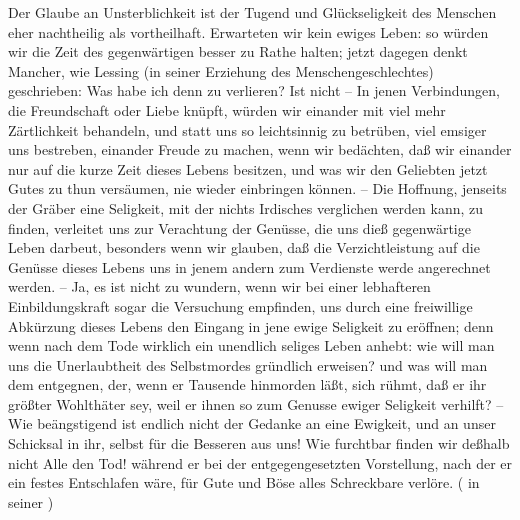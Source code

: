  Der Glaube an Unsterblichkeit ist der Tugend und Glückseligkeit des Menschen eher nachtheilig als vortheilhaft. Erwarteten wir kein ewiges Leben: so würden wir die Zeit des gegenwärtigen besser zu Rathe halten; jetzt dagegen denkt Mancher, wie Lessing (in seiner Erziehung des Menschengeschlechtes) geschrieben: Was habe ich denn zu verlieren? Ist nicht  -- In jenen Verbindungen, die Freundschaft oder Liebe knüpft, würden wir einander mit viel mehr Zärtlichkeit behandeln, und statt uns so leichtsinnig zu betrüben, viel emsiger uns bestreben, einander Freude zu machen, wenn wir bedächten, daß wir einander nur auf die kurze Zeit dieses Lebens besitzen, und was wir den Geliebten jetzt Gutes zu thun versäumen, nie wieder einbringen können. -- Die Hoffnung, jenseits der Gräber eine Seligkeit, mit der nichts Irdisches verglichen werden kann, zu finden, verleitet uns zur Verachtung der Genüsse, die uns dieß gegenwärtige Leben darbeut, besonders wenn wir glauben, daß die Verzichtleistung auf die Genüsse dieses Lebens uns in jenem andern zum Verdienste werde angerechnet werden. -- Ja, es ist nicht zu wundern, wenn wir bei einer lebhafteren Einbildungskraft sogar die Versuchung empfinden, uns durch eine freiwillige Abkürzung dieses Lebens den Eingang in jene ewige Seligkeit zu eröffnen; denn wenn nach dem Tode wirklich ein unendlich seliges Leben anhebt: wie will man uns die Unerlaubtheit des Selbstmordes gründlich erweisen? und was will man dem entgegnen, der, wenn er Tausende hinmorden läßt, sich rühmt, daß er ihr größter Wohlthäter sey, weil er ihnen so zum Genusse ewiger Seligkeit verhilft? -- Wie beängstigend ist endlich nicht der Gedanke an eine Ewigkeit, und an unser Schicksal in ihr, selbst für die Besseren aus uns! Wie furchtbar finden wir deßhalb nicht Alle den Tod! während er bei der entgegengesetzten Vorstellung, nach der er ein festes Entschlafen wäre, für Gute und Böse alles Schreckbare verlöre. ( in seiner  \uA )\par
{} 
